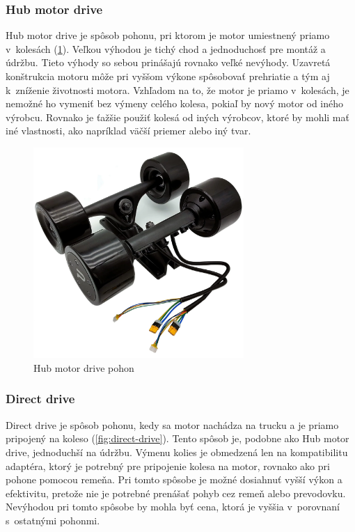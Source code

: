 \subsubsection{Hub motor drive}
Hub motor drive je spôsob pohonu, pri ktorom je motor umiestnený priamo v~kolesách (\ref{fig:hub-drive}).
Veľkou výhodou je tichý chod a jednoduchosť pre montáž a údržbu. 
Tieto výhody so sebou prinášajú rovnako veľké nevýhody.
Uzavretá konštrukcia motoru môže pri vyššom výkone spôsobovať prehriatie a tým aj k~zníženie životnosti motora. 
Vzhľadom na to, že motor je priamo v~kolesách, je nemožné ho vymeniť bez výmeny celého kolesa, pokiaľ by nový motor od iného výrobcu.
Rovnako je ťažšie použiť kolesá od iných výrobcov, ktoré by mohli mať iné vlastnosti, ako napríklad väčší priemer alebo iný tvar.\cite{WikiElectricSkateboard}

\begin{figure}[h]
    \centering
    \includegraphics[height=8cm, width=1\linewidth, keepaspectratio]{figures/drive-hub.png}
    \caption{Hub motor drive pohon\cite{Puaida}}\label{fig:hub-drive}
\end{figure}

\newpage

\subsubsection{Direct drive}
Direct drive je spôsob pohonu, kedy sa motor nachádza na trucku a je priamo pripojený na koleso (\ref{fig:direct-drive}).
Tento spôsob je, podobne ako Hub motor drive, jednoduchší na údržbu.
Výmenu kolies je obmedzená len na kompatibilitu adaptéra, ktorý je potrebný pre pripojenie kolesa na motor, rovnako ako pri pohone pomocou remeňa.
Pri tomto spôsobe je možné dosiahnuť vyšší výkon a efektivitu, pretože nie je potrebné prenášať pohyb cez remeň alebo prevodovku.
Nevýhodou pri tomto spôsobe by mohla byť cena, ktorá je vyššia v~porovnaní s~ostatnými pohonmi.\cite{WikiElectricSkateboard}

